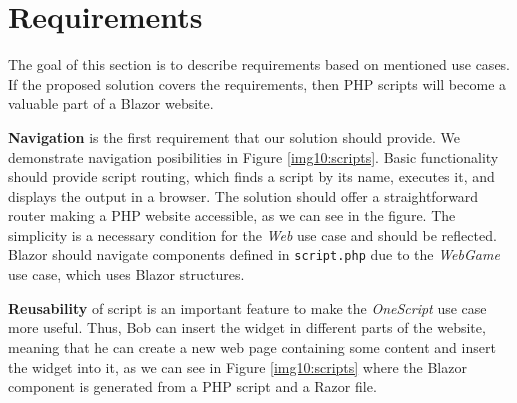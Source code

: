 \section{Requirements}

The goal of this section is to describe requirements based on mentioned use cases.
If the proposed solution covers the requirements, then PHP scripts will become a valuable part of a Blazor website.
\par
\textbf{Navigation} is the first requirement that our solution should provide.
We demonstrate navigation posibilities in Figure \ref{img10:scripts}.
Basic functionality should provide script routing, which finds a script by its name, executes it, and displays the output in a browser.
The solution should offer a straightforward router making a PHP website accessible, as we can see in the figure.
The simplicity is a necessary condition for the \textit{Web} use case and should be reflected.
Blazor should navigate components defined in \texttt{script.php} due to the \textit{WebGame} use case, which uses Blazor structures.
\par
\textbf{Reusability} of script is an important feature to make the \textit{OneScript} use case more useful.
Thus, Bob can insert the widget in different parts of the website, meaning that he can create a new web page containing some content and insert the widget into it, as we can see in Figure \ref{img10:scripts} where the Blazor component is generated from a PHP script and a Razor file.
\par
